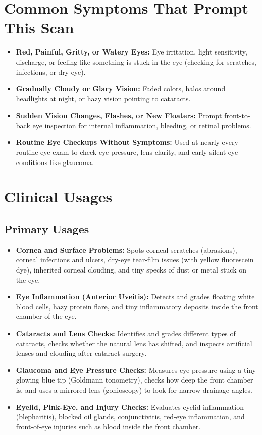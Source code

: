 \section{Common Symptoms That Prompt This Scan}
\begin{itemize}
    \item \textbf{Red, Painful, Gritty, or Watery Eyes:} Eye irritation, light sensitivity, discharge, or feeling like something is stuck in the eye (checking for scratches, infections, or dry eye).
    \item \textbf{Gradually Cloudy or Glary Vision:} Faded colors, halos around headlights at night, or hazy vision pointing to cataracts.
    \item \textbf{Sudden Vision Changes, Flashes, or New Floaters:} Prompt front-to-back eye inspection for internal inflammation, bleeding, or retinal problems.
    \item \textbf{Routine Eye Checkups Without Symptoms:} Used at nearly every routine eye exam to check eye pressure, lens clarity, and early silent eye conditions like glaucoma.
\end{itemize}

\section{Clinical Usages}

\subsection{Primary Usages}

\begin{itemize}
    \item \textbf{Cornea and Surface Problems:} Spots corneal scratches (abrasions), corneal infections and ulcers, dry-eye tear-film issues (with yellow fluorescein dye), inherited corneal clouding, and tiny specks of dust or metal stuck on the eye.
    \item \textbf{Eye Inflammation (Anterior Uveitis):} Detects and grades floating white blood cells, hazy protein flare, and tiny inflammatory deposits inside the front chamber of the eye.
    \item \textbf{Cataracts and Lens Checks:} Identifies and grades different types of cataracts, checks whether the natural lens has shifted, and inspects artificial lenses and clouding after cataract surgery.
    \item \textbf{Glaucoma and Eye Pressure Checks:} Measures eye pressure using a tiny glowing blue tip (Goldmann tonometry), checks how deep the front chamber is, and uses a mirrored lens (gonioscopy) to look for narrow drainage angles.
    \item \textbf{Eyelid, Pink-Eye, and Injury Checks:} Evaluates eyelid inflammation (blepharitis), blocked oil glands, conjunctivitis, red-eye inflammation, and front-of-eye injuries such as blood inside the front chamber.
\end{itemize}

